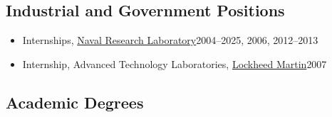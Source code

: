 \documentclass[11pt]{article}
\begin{document}
\subsection{Industrial and Government Positions}
\begin{itemize}
    \item Internships, \href{https://www.nrl.navy.mil}{Naval Research Laboratory}\hfill 2004--2025, 2006, 2012--2013
    \item Internship, Advanced Technology Laboratories, \href{https://lockheedmartin.com/en-us/capabilities/research-labs/advanced-technology-labs.html}{Lockheed Martin}\hfill 2007
\end{itemize}

\subsection{Academic Degrees}
\end{document}
